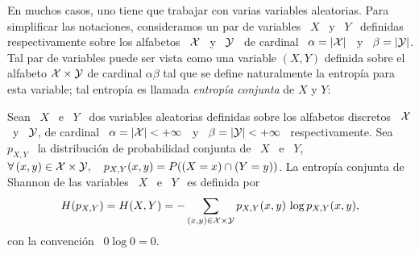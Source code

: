 En muchos  casos, uno tiene que  trabajar con varias  variables aleatorias. Para
simplificar las notaciones, consideramos  un par de variables \ $X$ \  y \ $Y$ \
definidas respectivamente sobre los alfabetos \ $\mathcal{X}$  \ y \ $\mathcal{Y}$ \ de cardinal \
$\alpha = |\mathcal{X}|$ \ y \ $\beta = |\mathcal{Y}|$.  Tal par de variables puede ser vista como
una  variable $(X,Y)$  definida sobre  el alfabeto  $\mathcal{X} \times  \mathcal{Y}$  de cardinal
$\alpha \beta$ tal que se  define naturalmente la entrop\'ia para esta variable;
tal entrop\'ia es llamada {\it entrop\'ia conjunta} de $X$ y $Y$:
%
\begin{definicion}[Entrop\'ia conjunta]\label{Def:SZ:EntropiaConjunta}
  Sean \ $X$ \ e \ $Y$  \ dos variables aleatorias definidas sobre los alfabetos
  discretos \  $\mathcal{X}$ \ y \ $\mathcal{Y}$,  de cardinal \ $\alpha  = |\mathcal{X}| < +\infty$  \ y \
  $\beta  =  |\mathcal{Y}|   <  +\infty$  \  respectivamente.   Sea   \  $p_{X,Y}$  \  la
  distribuci\'on de probabilidad conjunta de \ $X$ \ e \ $Y$, \ \ie $ \forall \,
  (x,y) \in \mathcal{X} \times  \mathcal{Y}, \quad p_{X,Y}(x,y) = P( (X = x) \cap  (Y = y) )$.  La
  entrop\'ia conjunta de Shannon de las variables  \ $X$ \ e \ $Y$ \ es definida
  por
  \[
  H(p_{X,Y}) =  H(X,Y) = -  \sum_{(x,y) \in \mathcal{X}  \times \mathcal{Y}} p_{X,Y}(x,y)  \, \log
  p_{X,Y}(x,y),
  \]
  con la convenci\'on \ $0 \log 0 = 0$.
\end{definicion}

